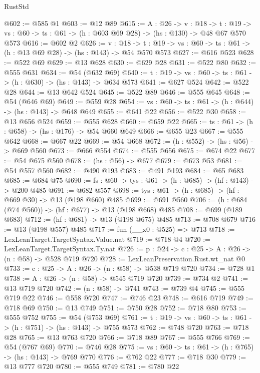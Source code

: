 \begin{lexlean}{RustStd}
\begin{coremodule}
{\begin{coremodule}
{{{{{{{{{{{{{{{{{{{{{@602 := @585 @1
@603 := @12 @89
@615 := {A : @26} ->
  {v : @18} ->
  {t : @19} -> {vs : @60} -> {ts : @61} -> (h : @603 @69 @28) -> (hs : @130) -> @48 @67 @570 @573
@616 := @602 @2
@626 := {v : @18} ->
  {t : @19} -> {vs : @60} -> {ts : @61} -> (h : @13 @69 @28) -> (hs : @143) -> @54 @570 @573
@627 := @616 @523
@628 := @522 @69
@629 := @13 @628
@630 := @629 @28
@631 := @522 @80
@632 := @555 @631
@634 := @54 (@632 @69)
@640 := {t : @19} -> {vs : @60} -> {ts : @61} -> (h : @630) -> (hs : @143) -> @634 @573
@641 := @627 @524
@642 := @522 @28
@644 := @13 @642 @524
@645 := @522 @89
@646 := @555 @645
@648 := @54 (@646 @69)
@649 := @559 @28
@654 := {vs : @60} -> {ts : @61} -> (h : @644) -> (hs : @143) -> @648 @649
@655 := @641 @22
@656 := @522 @30
@658 := @13 @656 @524
@659 := @555 @628
@660 := @659 @22
@665 := {ts : @61} -> (h : @658) -> (hs : @176) -> @54 @660 @649
@666 := @655 @23
@667 := @555 @642
@668 := @667 @22
@669 := @54 @668
@672 := (h : @552) -> (hs : @56) -> @669 @560
@673 := @666 @554
@674 := @555 @656
@675 := @674 @22
@677 := @54 @675 @560
@678 := (hs : @56) -> @677
@679 := @673 @53
@681 := @54 @557 @560
@682 := @490 @193
@683 := @491 @193
@684 := @65 @683
@685 := @684 @75
@690 := {fs : @60} -> {tys : @61} -> (h : @685) -> (hf : @143) -> @200 @485
@691 := @682 @557
@698 := {tys : @61} -> (h : @685) -> (hf : @669 @30) -> @13 (@198 @660) @485
@699 := @691 @560
@706 := (h : @684 (@74 @560)) -> (hf : @677) -> @13 (@198 @668) @485
@708 := @699 (@189 @683)
@712 := (hf : @681) -> @13 (@198 @675) @485
@713 := @708 @679
@716 := @13 (@198 @557) @485
@717 := fun (__x0 : @525) => @713
@718 := LexLeanTarget.TargetSyntax.Value.nat
@719 := @718 @4
@720 := LexLeanTarget.TargetSyntax.Ty.nat
@726 := {p : @24} -> {c : @25} -> {A : @26} -> (n : @58) -> @528 @719 @720
@728 := LexLeanPreservation.Rust.wt_nat @0
@733 := {c : @25} -> {A : @26} -> (n : @58) -> @538 @719 @720
@734 := @728 @1
@738 := {A : @26} -> (n : @58) -> @545 @719 @720
@739 := @734 @2
@741 := @13 @719 @720
@742 := (n : @58) -> @741
@743 := @739 @4
@745 := @555 @719 @22
@746 := @558 @720
@747 := @746 @23
@748 := @616 @719
@749 := @718 @69
@750 := @13 @749
@751 := @750 @28
@752 := @718 @80
@753 := @555 @752
@755 := @54 (@753 @69)
@761 := {t : @19} -> {vs : @60} -> {ts : @61} -> (h : @751) -> (hs : @143) -> @755 @573
@762 := @748 @720
@763 := @718 @28
@765 := @13 @763 @720
@766 := @718 @89
@767 := @555 @766
@769 := @54 (@767 @69)
@770 := @746 @28
@775 := {vs : @60} -> {ts : @61} -> (h : @765) -> (hs : @143) -> @769 @770
@776 := @762 @22
@777 := @718 @30
@779 := @13 @777 @720
@780 := @555 @749
@781 := @780 @22
}}}}}}}}}}}}}}}}}}}}}
\end{coremodule}}
\end{coremodule}
\end{lexlean}
